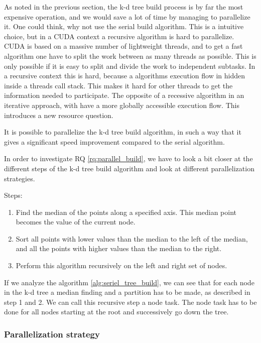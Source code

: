 
As noted in the previous section, the k-d tree build process is by far the most expensive operation, and we would save a lot of time by managing to parallelize it. One could think, why not use the serial build algorithm. This is a intuitive choice, but in a CUDA context a recursive algorithm is hard to parallelize. CUDA is based on a massive number of lightweight threads, and to get a fast algorithm one have to split the work between as many threads as possible. This is only possible if it is easy to split and divide the work to independent subtasks. In a recursive context this is hard, because a algorithms execution flow in hidden inside a threads call stack. This makes it hard for other threads to get the information needed to participate. The opposite of a recessive algorithm in an iterative approach, with have a more globally accessible execution flow. This introduces a new resource question.

\begin{myrq}
\label{rq:parallel_build}
    It is possible to parallelize the k-d tree build algorithm, in such a way that it gives a significant speed improvement compared to the serial algorithm.
\end{myrq}

In order to investigate RQ \ref{rq:parallel_build}, we have to look a bit closer at the different steps of the k-d tree build algorithm and look at different parallelization strategies.

Steps:
\begin{enumerate}
    \item Find the median of the points along a specified axis. This median point becomes the value of the current node.
    \item Sort all points with lower values than the median to the left of the median, and all the points with higher values than the median to the right.
    \item Perform this algorithm recursively on the left and right set of nodes.
\end{enumerate}

If we analyze the algorithm \ref{alg:seriel_tree_build}, we can see that for each node in the k-d tree a median finding and a partition has to be made, as described in step 1 and 2. We can call this recursive step a node task. The node task has to be done for all nodes starting at the root and successively go down the tree.



\subsubsection{Parallelization strategy} %
\label{ssub:parallelization_strategy}


